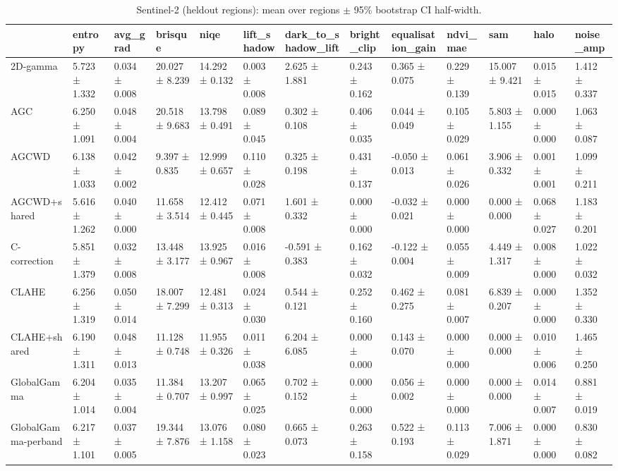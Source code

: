 \begin{table}[t]
\caption{Sentinel-2 (heldout regions): mean over regions $\pm$ 95\% bootstrap CI half-width.}
\label{tab:s2_summary_heldout}
\begin{tabular}{lllllllllllll}
\toprule
 & entropy & avg\_grad & brisque & niqe & lift\_shadow & dark\_to\_shadow\_lift & bright\_clip & equalisation\_gain & ndvi\_mae & sam & halo & noise\_amp \\
\midrule
2D-gamma & 5.723 ± 1.332 & 0.034 ± 0.008 & 20.027 ± 8.239 & 14.292 ± 0.132 & 0.003 ± 0.008 & 2.625 ± 1.881 & 0.243 ± 0.162 & 0.365 ± 0.075 & 0.229 ± 0.139 & 15.007 ± 9.421 & 0.015 ± 0.015 & 1.412 ± 0.337 \\
AGC & 6.250 ± 1.091 & 0.048 ± 0.004 & 20.518 ± 9.683 & 13.798 ± 0.491 & 0.089 ± 0.045 & 0.302 ± 0.108 & 0.406 ± 0.035 & 0.044 ± 0.049 & 0.105 ± 0.029 & 5.803 ± 1.155 & 0.000 ± 0.000 & 1.063 ± 0.087 \\
AGCWD & 6.138 ± 1.033 & 0.042 ± 0.002 & 9.397 ± 0.835 & 12.999 ± 0.657 & 0.110 ± 0.028 & 0.325 ± 0.198 & 0.431 ± 0.137 & -0.050 ± 0.013 & 0.061 ± 0.026 & 3.906 ± 0.332 & 0.001 ± 0.001 & 1.099 ± 0.211 \\
AGCWD+shared & 5.616 ± 1.262 & 0.040 ± 0.000 & 11.658 ± 3.514 & 12.412 ± 0.445 & 0.071 ± 0.008 & 1.601 ± 0.332 & 0.000 ± 0.000 & -0.032 ± 0.021 & 0.000 ± 0.000 & 0.000 ± 0.000 & 0.068 ± 0.027 & 1.183 ± 0.201 \\
C-correction & 5.851 ± 1.379 & 0.032 ± 0.008 & 13.448 ± 3.177 & 13.925 ± 0.967 & 0.016 ± 0.008 & -0.591 ± 0.383 & 0.162 ± 0.032 & -0.122 ± 0.004 & 0.055 ± 0.009 & 4.449 ± 1.317 & 0.008 ± 0.000 & 1.022 ± 0.032 \\
CLAHE & 6.256 ± 1.319 & 0.050 ± 0.014 & 18.007 ± 7.299 & 12.481 ± 0.313 & 0.024 ± 0.030 & 0.544 ± 0.121 & 0.252 ± 0.160 & 0.462 ± 0.275 & 0.081 ± 0.007 & 6.839 ± 0.207 & 0.000 ± 0.000 & 1.352 ± 0.330 \\
CLAHE+shared & 6.190 ± 1.311 & 0.048 ± 0.013 & 11.128 ± 0.748 & 11.955 ± 0.326 & 0.011 ± 0.038 & 6.204 ± 6.085 & 0.000 ± 0.000 & 0.143 ± 0.070 & 0.000 ± 0.000 & 0.000 ± 0.000 & 0.010 ± 0.006 & 1.465 ± 0.250 \\
GlobalGamma & 6.204 ± 1.014 & 0.035 ± 0.004 & 11.384 ± 0.707 & 13.207 ± 0.997 & 0.065 ± 0.025 & 0.702 ± 0.152 & 0.000 ± 0.000 & 0.056 ± 0.002 & 0.000 ± 0.000 & 0.000 ± 0.000 & 0.014 ± 0.007 & 0.881 ± 0.019 \\
GlobalGamma-perband & 6.217 ± 1.101 & 0.037 ± 0.005 & 19.344 ± 7.876 & 13.076 ± 1.158 & 0.080 ± 0.023 & 0.665 ± 0.073 & 0.263 ± 0.158 & 0.522 ± 0.193 & 0.113 ± 0.029 & 7.006 ± 1.871 & 0.000 ± 0.000 & 0.830 ± 0.082 \\

\end{tabular}
\end{table}
